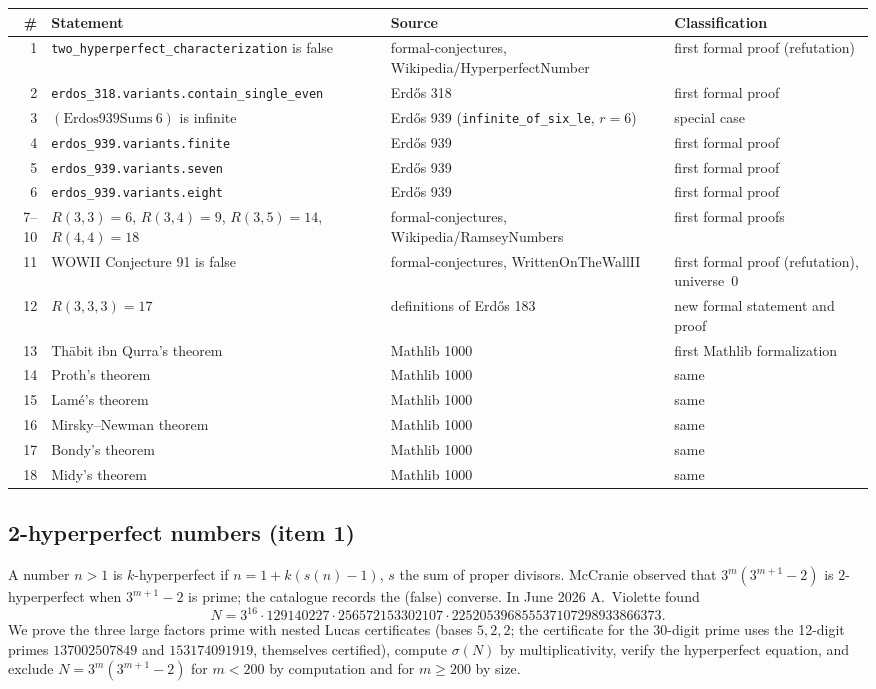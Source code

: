 \documentclass[11pt,a4paper]{article}
\newcommand{\lean}[1]{\texttt{#1}}
\begin{document}
\begin{longtable}{@{}rp{6.2cm}p{3.6cm}p{3.2cm}@{}}
\toprule
\# & Statement & Source & Classification\\
\midrule
1 & \lean{two\_hyperperfect\_characterization} is false & formal-conjectures,
  Wikipedia/HyperperfectNumber & first formal proof (refutation)\\
2 & \lean{erdos\_318.variants.contain\_single\_even} & Erd\H{o}s 318 & first formal proof\\
3 & $(\mathrm{Erdos939Sums}\ 6)$ is infinite & Erd\H{o}s 939 (\lean{infinite\_of\_six\_le}, $r=6$)
  & special case\\
4 & \lean{erdos\_939.variants.finite} & Erd\H{o}s 939 & first formal proof\\
5 & \lean{erdos\_939.variants.seven} & Erd\H{o}s 939 & first formal proof\\
6 & \lean{erdos\_939.variants.eight} & Erd\H{o}s 939 & first formal proof\\
7--10 & $R(3,3)=6$, $R(3,4)=9$, $R(3,5)=14$, $R(4,4)=18$ & formal-conjectures,
  Wikipedia/RamseyNumbers & first formal proofs\\
11 & WOWII Conjecture 91 is false & formal-conjectures, WrittenOnTheWallII
  & first formal proof (refutation), universe~0\\
12 & $R(3,3,3)=17$ & definitions of Erd\H{o}s 183 & new formal statement and proof\\
13 & Th\=abit ibn Qurra's theorem & Mathlib 1000 & first Mathlib formalization\\
14 & Proth's theorem & Mathlib 1000 & same\\
15 & Lam\'e's theorem & Mathlib 1000 & same\\
16 & Mirsky--Newman theorem & Mathlib 1000 & same\\
17 & Bondy's theorem & Mathlib 1000 & same\\
18 & Midy's theorem & Mathlib 1000 & same\\
\bottomrule
\end{longtable}

\subsection{2-hyperperfect numbers (item 1)}
A number $n>1$ is $k$-hyperperfect if $n = 1 + k(s(n)-1)$, $s$ the sum of proper divisors.
McCranie observed that $3^m(3^{m+1}-2)$ is $2$-hyperperfect when $3^{m+1}-2$ is prime; the
catalogue records the (false) converse. In June 2026 A.~Violette found
\[ N = 3^{16}\cdot 129140227\cdot 256572153302107\cdot 225205396855537107298933866373. \]
We prove the three large factors prime with nested Lucas certificates (bases $5,2,2$; the
certificate for the 30-digit prime uses the 12-digit primes $137002507849$ and
$153174091919$, themselves certified), compute $\sigma(N)$ by multiplicativity, verify the
hyperperfect equation, and exclude $N = 3^m(3^{m+1}-2)$ for $m<200$ by computation and for
$m\ge 200$ by size.
\end{document}
